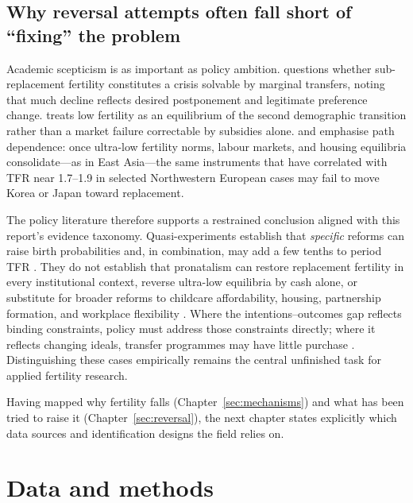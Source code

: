 \documentclass[11pt,a4paper,openany]{book}
\begin{document}
\section[Why reversal attempts fall short]{Why reversal attempts often fall short of ``fixing'' the problem}

Academic scepticism is as important as policy ambition. \citet{morgan2003} questions whether sub-replacement fertility constitutes a crisis solvable by marginal transfers, noting that much decline reflects desired postponement and legitimate preference change. \citet{lesthaeghe2010} treats low fertility as an equilibrium of the second demographic transition rather than a market failure correctable by subsidies alone. \citet{kohler2002} and \citet{jones2019} emphasise path dependence: once ultra-low fertility norms, labour markets, and housing equilibria consolidate---as in East Asia---the same instruments that have correlated with TFR near 1.7--1.9 in selected Northwestern European cases may fail to move Korea or Japan toward replacement.

The policy literature therefore supports a restrained conclusion aligned with this report's evidence taxonomy. Quasi-experiments establish that \emph{specific} reforms can raise birth probabilities and, in combination, may add a few tenths to period TFR \citep{sobotka2020,milligan2005}. They do not establish that pronatalism can restore replacement fertility in every institutional context, reverse ultra-low equilibria by cash alone, or substitute for broader reforms to childcare affordability, housing, partnership formation, and workplace flexibility \citep{doepke2023,mcdonald2006}. Where the intentions--outcomes gap reflects binding constraints, policy must address those constraints directly; where it reflects changing ideals, transfer programmes may have little purchase \citep{beaujouan2019,bujard2025}. Distinguishing these cases empirically remains the central unfinished task for applied fertility research.

Having mapped why fertility falls (Chapter~\ref{sec:mechanisms}) and what has been tried to raise it (Chapter~\ref{sec:reversal}), the next chapter states explicitly which data sources and identification designs the field relies on.

\FloatBarrier
\chapter{Data and methods}
\label{sec:methods}
\end{document}

